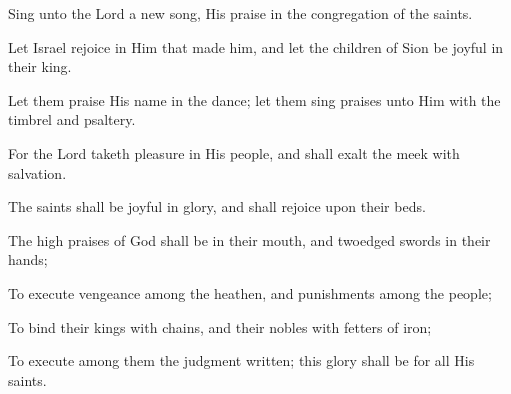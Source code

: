 Sing unto the Lord a new song, His praise in the congregation of the saints.

Let Israel rejoice in Him that made him, and let the children of Sion be joyful in their king.

Let them praise His name in the dance; let them sing praises unto Him with the timbrel and psaltery.

For the Lord taketh pleasure in His people, and shall exalt the meek with salvation.

The saints shall be joyful in glory, and shall rejoice upon their beds.

The high praises of God shall be in their mouth, and twoedged swords in their hands;

To execute vengeance among the heathen, and punishments among the people;

To bind their kings with chains, and their nobles with fetters of iron;

To execute among them the judgment written; this glory shall be for all His saints.
